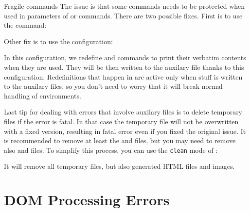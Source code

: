 \begin{issue}{Fragile commands}
The issue is that some commands needs to be protected when used in parameters of \texcommand{\section}
or \texcommand{\caption} commands. There are two possible fixes. First is to use the \texcommand{\protect}
command:

\begin{texsource}
\caption{$\protect\begin{array}{c c} hello & world\protect\end{array}$}
\end{texsource}

Other fix is to use the  configuration:

\begin{texsource}
\end{texsource}

In this configuration, we redefine \texcommand{\begin} and \texcommand{\end} commands to print
their verbatim contents when they are used. They will be then written to the auxilary file
thanks to this configuration.
Redefinitions that happen in  are active only when stuff is written to the auxilary
files, so you don't need to worry that it will break normal handling of environments.

Last tip for dealing with errors that involve auxilary files is to delete temporary files if the 
error is fatal. In that case the temporary file will not be overwritten with a fixed version, 
resulting in fatal error even if you fixed the original issue. It is recommended to remove at least 
the  and  files, but you may need to remove also  and  files.
To simplify this process, you can use the \texttt{clean} mode of \makefourht:


It will remove all temporary files, but also generated HTML files and images.

\end{issue}

\section{DOM Processing Errors}
\label{faq:dom_processing}

